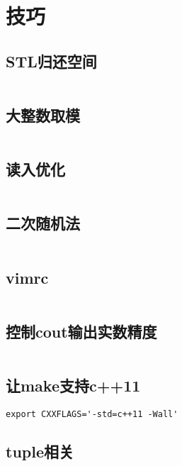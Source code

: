 \section{技巧}
\subsection{STL归还空间}
\inputminted{cpp}{\source/tricks/truly-release-container-space.cpp}
\subsection{大整数取模}
\inputminted{cpp}{\source/tricks/O1-multiply-mod.cpp}
\subsection{读入优化}
\inputminted{cpp}{\source/tricks/unbeatable-input-acceleration.cpp}
\subsection{二次随机法}
\inputminted{cpp}{\source/tricks/mersenne-twister.cpp}
\subsection{vimrc}
\inputminted{cpp}{\source/tricks/vimrc}
\subsection{控制cout输出实数精度}
\inputminted{cpp}{\source/tricks/control-cout-precision.cpp}
\subsection{让make支持c++11}
\begin{verbatim}
export CXXFLAGS='-std=c++11 -Wall'
\end{verbatim}
\subsection{tuple相关}
\inputminted{cpp}{\source/tricks/tuple.cpp}
